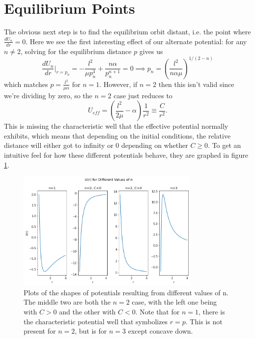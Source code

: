\documentclass[letterpaper, reqno,11pt]{article}
\begin{document}
\section{Equilibrium Points}

The obvious next step is to find the equilibrium orbit distant, i.e. the point where $\frac{dU_n}{dr}=0$. Here we see the first interesting effect of our alternate potential: for any $n\neq 2$, solving for the equilibrium distance $p$ gives us
\[
\frac{dU_n}{dr}\bigg|_{r=p_n}=-\frac{l^2}{\mu p_n^3}+\frac{n\alpha}{p_n^{n+1}}=0\implies p_n=\left( \frac{l^2}{ n\alpha\mu} \right)^{1 /(2-n)}
\]
which matches $p=\frac{l^2}{\mu\alpha}$ for $n=1$. However, if $n=2$ then this isn't valid since we're dividing by zero, so the $n=2$ case just reduces to
\[
U_{eff}=\left( \frac{l^2}{2\mu}-\alpha \right)\frac{1}{r^2}\equiv \frac{C}{r^2}
.\]
This is missing the characteristic well that the effective potential normally exhibits, which means that depending on the initial conditions, the relative distance will either got to infinity or $0$ depending on whether $C\geq 0$. To get an intuitive feel for how these different potentials behave, they are graphed in figure \ref{fig:U-plots}. 

\begin{figure}[htpb]
    \centering
    \includegraphics[width=0.8\textwidth]{U-plots}
    \caption{Plots of the shapes of potentials resulting from different values of n. The middle two are both the $n=2$ case, with the left one being with $C>0$ and the other with $C<0$. Note that for $n=1$, there is the characteristic potential well that symbolizes $r=p$. This is not present for $n=2$, but is for $n=3$ except concave down. }
    \label{fig:U-plots}
\end{figure}
\end{document}
